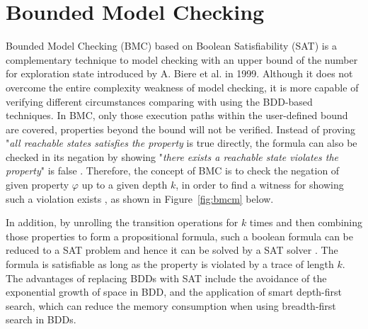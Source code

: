 \section{Bounded Model Checking} \label{sec:bmc}
Bounded Model Checking (BMC) based on Boolean Satisfiability (SAT) is a complementary technique to model checking with an upper bound of the number for exploration state introduced by A. Biere et al. in 1999\cite{biere2003bounded}. Although it does not overcome the entire complexity weakness of model checking, it is more capable of verifying different circumstances comparing with using the BDD-based techniques. In BMC, only those execution paths within the user-defined bound are covered, properties beyond the bound will not be verified. Instead of proving "\textit{all reachable states satisfies the property} is true directly, the formula can also be checked in its negation by showing "\textit{there exists a reachable state violates the property}" is false \cite{Clarke:2001:BMC:510986.510987}. Therefore, the concept of BMC is to check the negation of given property $\varphi$ up to a given depth $k$, in order to find a witness for showing such a violation exists \cite{7423219}, as shown in Figure~\ref{fig:bmcm} below. 




In addition, by unrolling the transition operations for $k$ times and then combining those properties to form a propositional formula, such a boolean formula can be reduced to a SAT problem and hence it can be solved by a SAT solver \cite{biere2003bounded, 1_sagiv_2015}. The formula is satisfiable as long as the property is violated by a trace of length $k$. The advantages of replacing BDDs with SAT include the avoidance of the exponential growth of space in BDD, and the application of smart depth-first search, which can reduce the memory consumption when using breadth-first search in BDDs. 

